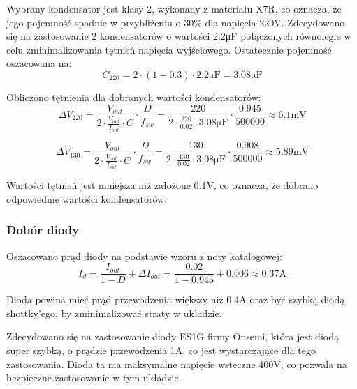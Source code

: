\documentclass[../../main.tex]{subfiles}
\begin{document}
Wybrany kondensator jest klasy 2, wykonany z materiału X7R, co oznacza, że jego pojemność spadnie w przybliżeniu o 30\% dla napięcia 220\si{\volt}.
Zdecydowano się na zastosowanie 2 kondensatorów o wartości 2.2\si{\micro\farad} połączonych równolegle w celu zminimalizowania tętnień napięcia wyjściowego.
Ostatecznie pojemność oszacowana na:
\begin{equation}
    C_{220} = 2 \cdot (1-0.3) \cdot 2.2\si{\micro\farad} = 3.08\si{\micro\farad}
\end{equation}

Obliczono tętnienia dla dobranych wartości kondensatorów:
\begin{equation}
    \Delta V_{220} = \frac{V_{out}}{2 \cdot \frac{V_{out}}{I_{out}} \cdot C} \cdot \frac{D}{f_{sw}} = \frac{220}{2 \cdot \frac{220}{0.02} \cdot 3.08\si{\micro\farad}} \cdot \frac{0.945}{500000} \approx 6.1\si{\milli\volt}
\end{equation}

\begin{equation}
    \Delta V_{130} = \frac{V_{out}}{2 \cdot \frac{V_{out}}{I_{out}} \cdot C} \cdot \frac{D}{f_{sw}} = \frac{130}{2 \cdot \frac{130}{0.02} \cdot 3.08\si{\micro\farad}} \cdot \frac{0.908}{500000} \approx 5.89\si{\milli\volt}
\end{equation}

Wartości tętnień jest mniejsza niż założone 0.1\si{\volt}, co oznacza, że dobrano odpowiednie wartości kondensatorów.

\subsubsection{Dobór diody}
Oszacowano prąd diody na podstawie wzoru z noty katalogowej:
\begin{equation}
    I_{d} = \frac{I_{out}}{1-D} + \Delta I_{out} = \frac{0.02}{1-0.945} + 0.006 \approx 0.37\si{\ampere}
\end{equation}

Dioda powina mieć prąd przewodzenia większy niż 0.4\si{\ampere} oraz być szybką diodą shottky'ego, by zminimalizować straty w układzie.

Zdecydowano się na zastosowanie diody ES1G firmy Onsemi, 
która jest diodą super szybką, o prądzie przewodzenia 1\si{\ampere}, co jest wystarczające dla tego zastosowania.
Dioda ta ma maksymalne napięcie wsteczne 400\si{\volt}, co pozwala na bezpieczne zastosowanie w tym układzie.
\end{document}

